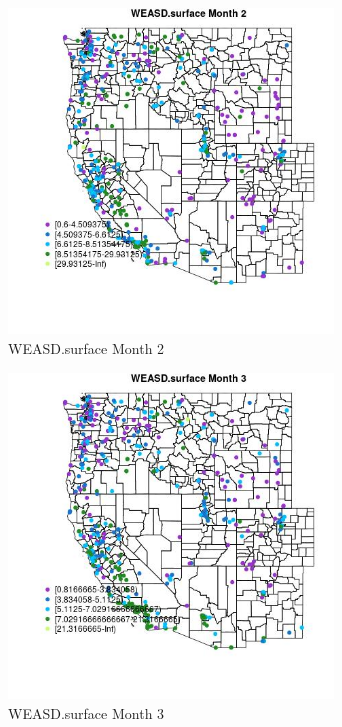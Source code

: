 \begin{figure} 
\centering  
\includegraphics[width=0.77\textwidth]{Code_Outputs/ML_input_report_ML_input_PM25_Step5_part_d_de_duplicated_aves_ML_input_MapObsMo2WEASDsurface.jpg} 
\caption{\label{fig:ML_input_report_ML_input_PM25_Step5_part_d_de_duplicated_aves_ML_inputMapObsMo2WEASDsurface}WEASD.surface Month 2} 
\end{figure} 
 

\begin{figure} 
\centering  
\includegraphics[width=0.77\textwidth]{Code_Outputs/ML_input_report_ML_input_PM25_Step5_part_d_de_duplicated_aves_ML_input_MapObsMo3WEASDsurface.jpg} 
\caption{\label{fig:ML_input_report_ML_input_PM25_Step5_part_d_de_duplicated_aves_ML_inputMapObsMo3WEASDsurface}WEASD.surface Month 3} 
\end{figure} 
 

